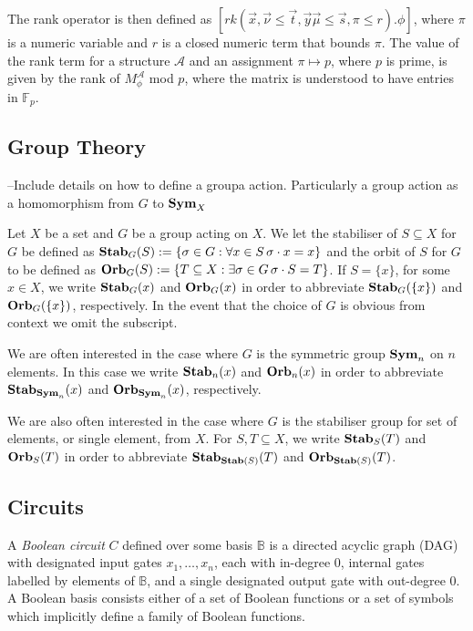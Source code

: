 \documentclass[../paper.tex]{subfiles}
\begin{document}
The rank operator is then defined as $[rk (\vec{x}, \vec {\nu} \leq \vec{t},
\vec{y}\vec{\mu} \leq \vec{s}, \pi \leq r). \phi]$, where $\pi$ is a numeric
variable and $r$ is a closed numeric term that bounds $\pi$. The value of the
rank term for a structure $\mathcal{A}$ and an assignment $\pi \mapsto p$, where
$p$ is prime, is given by the rank  of $M^{\mathcal{A}}_\phi$ mod $p$, where the
matrix is understood to have entries in $\mathbb{F}_p$.

\subsection{Group Theory}
--Include details on how to define a groupa action. Particularly a group action
as a homomorphism from $G$ to $\text{\textbf{Sym}}_X$

Let $X$ be a set and $G$ be a group acting on $X$. We let the stabiliser of $S
\subseteq X$ for $G$ be defined as $\text{\textbf{Stab}}_G(S) := \{ \sigma \in G : \forall x
\in S \, \sigma \cdot x = x \}$ and the orbit of $S$ for $G$ to be defined as
$\text{\textbf{Orb}}_G (S) := \{ T \subseteq X : \exists \sigma \in G \, \sigma \cdot S = T
\}$. If $S = \{x\}$, for some $x \in X$, we write $\text{\textbf{Stab}}_G (x)$ and $\text{\textbf{Orb}}_G(x)$
in order to abbreviate $\text{\textbf{Stab}}_G(\{x\})$ and $\text{\textbf{Orb}}_G(\{x\})$, respectively. In
the event that the choice of $G$ is obvious from context we omit the subscript.

We are often interested in the case where $G$ is the symmetric group $\text{\textbf{Sym}}_n$ on
$n$ elements. In this case we write $\text{\textbf{Stab}}_n(x)$ and $\text{\textbf{Orb}}_n(x)$ in order to
abbreviate $\text{\textbf{Stab}}_{\text{\textbf{Sym}}_n}(x)$ and $\text{\textbf{Orb}}_{\text{\textbf{Sym}}_n}(x)$, respectively.

We are also often interested in the case where $G$ is the stabiliser group for
set of elements, or single element, from $X$. For $S, T \subseteq X$, we write
$\text{\textbf{Stab}}_{S}(T)$ and $\text{\textbf{Orb}}_{S}(T)$ in order to abbreviate $\text{\textbf{Stab}}_{\text{\textbf{Stab}}(S)}(T)$
and $\text{\textbf{Orb}}_{\text{\textbf{Stab}}(S)}(T)$.

\subsection{Circuits}
A \emph{Boolean circuit} $C$ defined over some basis $\mathbb{B}$ is a directed
acyclic graph (DAG) with designated input gates $x_1, \ldots, x_n$, each with
in-degree $0$, internal gates labelled by elements of $\mathbb{B}$, and a single
designated output gate with out-degree 0. A Boolean basis consists either of a
set of Boolean functions or a set of symbols which implicitly define a family of
Boolean functions.
\end{document}
